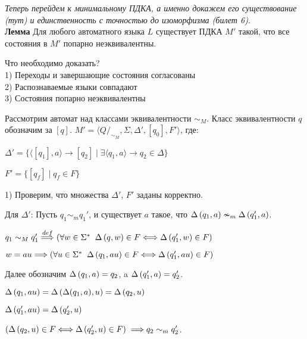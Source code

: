 \textit{Теперь перейдем к минимальному ПДКА, а именно докажем его существование (тут) и единственность с точностью до изоморфизма (билет 6).}\\

\textbf{Лемма} Для любого автоматного языка $L$ существует ПДКА $M'$ такой, что все состояния в $M'$ попарно неэквивалентны.

Что необходимо доказать?\\
1) Переходы и завершающие состояния согласованы\\
2) Распознаваемые языки совпадают\\
3) Состояния попарно неэквивалентны

\Proof Рассмотрим автомат над классами эквивалентности $\sim_M$. Класс эквивалентности $q$ обозначим за $[q]$. $M' = \langle Q /_{\sim_M}, \Sigma, \Delta', [q_0], F' \rangle$, где:

\begin{center}
    $\Delta' = \{ \langle [q_1], a \rangle \rightarrow [q_2] \;|\; \exists \langle q_1, a \rangle \rightarrow q_2 \in \Delta \}$
    
    $F' = \{ [q_f] \;|\; q_f \in F \}$
\end{center}

1) Проверим, что множества $\Delta'$, $F'$ заданы корректно.

Для $\Delta'$: Пусть $q_1 \sim_m q_1'$, и существует $a$ такое, что $\Delta \left({q_1, a}\right) \nsim_m \Delta \left({q_1', a}\right)$.
\begin{center}
    $q_1 \sim_M q_1' \stackrel{def}{\Longrightarrow} (\forall w \in \Sigma^* \;\;\Delta \left({q, w}\right) \in F \Longleftrightarrow \Delta \left({q_1', w}\right) \in F)$
    
    $w = au \Longrightarrow (\forall u \in \Sigma^* \;\; \Delta \left({q_1, au}\right) \in F \Longleftrightarrow \Delta \left({q_1', au}\right) \in F)$
\end{center}

Далее обозначим $\Delta \left({q_1, a}\right) = q_2$, a $\Delta \left({q_1', a}\right) = q_2'$.
\begin{center}
    $\Delta \left({q_1, au}\right) = \Delta \left({\Delta(q_1, a), u}\right) = \Delta \left({q_2, u}\right)$
    
    $\Delta \left({q_1', au}\right) = \Delta \left({q_2', u}\right)$
    
    $(\Delta \left({q_2, u}\right) \in F \Longleftrightarrow \Delta \left({q_2', u}\right) \in F)\; \Longrightarrow q_2 \sim_m q_2'$.
\end{center}


